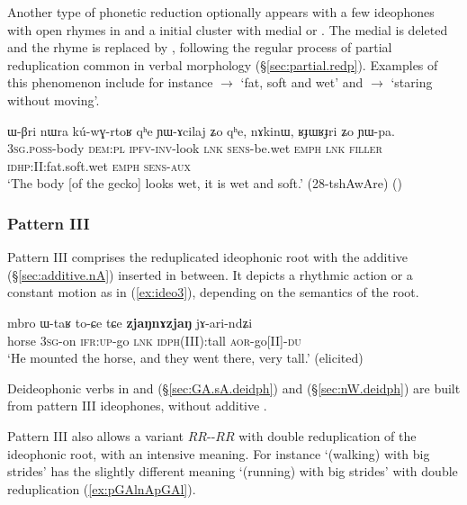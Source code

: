 Another type of phonetic reduction optionally appears with a few ideophones with open rhymes in  and a initial cluster with medial  or . The medial is deleted and the rhyme is replaced by , following the regular process of partial reduplication common in verbal morphology (§\ref{sec:partial.redp}). Examples of this phenomenon include for instance  $\rightarrow$  `fat, soft and wet' and   $\rightarrow$  `staring without moving'.

  \begin{exe} 
\ex  \label{ex:RJWRJri}
\gll ɯ-βri nɯra kú-wɣ-rtoʁ qʰe ɲɯ-ɤcilaj ʑo qʰe, nɤkinɯ, ʁɟɯʁɟri ʑo ɲɯ-pa. \\
\textsc{3sg}.\textsc{poss}-body \textsc{dem}:\textsc{pl} \textsc{ipfv}-\textsc{inv}-look \textsc{lnk} \textsc{sens}-be.wet \textsc{emph} \textsc{lnk} \textsc{filler} \textsc{idhp}:II:fat.soft.wet \textsc{emph} \textsc{sens}-\textsc{aux} \\
\glt `The body [of the gecko] looks wet, it is wet and soft.' (28-tshAwAre) 	()
  \end{exe}

\subsubsection{Pattern III} \label{sec:ideo.III}
  Pattern III comprises the reduplicated ideophonic root with the additive   (§\ref{sec:additive.nA}) inserted in between. It depicts a rhythmic action  or a constant motion as in (\ref{ex:ideo3}), depending on the semantics of the root.   
  
 \begin{exe} 
\ex  \label{ex:ideo3}
\gll  mbro ɯ-taʁ to-ɕe tɕe \textbf{zjaŋnɤzjaŋ} jɤ-ari-ndʑi   \\
horse \textsc{3sg}-on  \textsc{ifr}:\textsc{up}-go \textsc{lnk} \textsc{idph}(III):tall  \textsc{aor}-go[II]-\textsc{du} \\
\glt `He mounted the horse, and  they went there, very tall.'  (elicited)
 \end{exe} 
 
 Deideophonic verbs in  and  (§\ref{sec:GA.sA.deidph}) and  (§\ref{sec:nW.deidph}) are built from pattern III ideophones, without additive .
 
  Pattern III also allows a variant $RR$--$RR$ with double reduplication of the ideophonic root, with an intensive meaning. For instance  `(walking) with big strides' has the slightly different meaning `(running) with big strides' with double reduplication (\ref{ex:pGAlnApGAl}).
  
